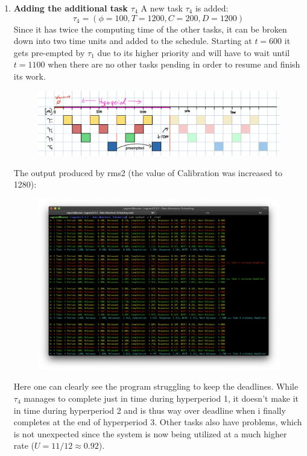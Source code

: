 \begin{enumerate}[label=\textbf{\arabic*})]
\item \textbf{Adding the additional task  $\tau_4$}
    A new task $\tau_4$ is added:
        \[\tau_4 = (\phi = 100, T = 1200, C = 200, D = 1200)\]
        Since it has twice the computing time of the other tasks, it can be broken down into two time units and added to the schedule. Starting at $t = 600$ it gets pre-empted by $\tau_1$ due to its higher priority and will have to wait until $t = 1100$ when there are no other tasks pending in order to resume and finish its work.
\begin{figure}[H]
        \includegraphics[width=\linewidth]{4-1-rms2-schedule}
\end{figure}
        The output produced by rms2 (the value of Calibration was increased to 1280):
\begin{figure}[H]
        \includegraphics[width=\linewidth]{4-rms2-output}
\end{figure}
        Here one can clearly see the program struggling to keep the deadlines. While $\tau_4$ manages to complete just in time during hyperperiod 1, it doesn't make it in time during hyperperiod 2 and is thus way over deadline when i finally completes at the end of hyperperiod 3. Other tasks also have problems, which is not unexpected since the system is now being utilized at a much higher rate ($U = 11/12 \approx 0.92$).

\end{enumerate}
